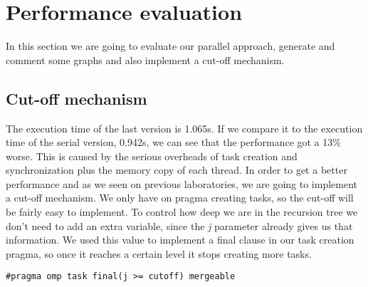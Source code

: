 \section{Performance evaluation}
\justify
In this section we are going to evaluate our parallel approach, generate and comment some graphs and also implement a cut-off mechanism.
\subsection{Cut-off mechanism}
The execution time of the last version is 1.065s. If we compare it to the execution time of the serial version, 0.942s, we can see that the performance got a 13\% worse. This is caused by the serious overheads of task creation and synchronization plus the memory copy of each thread. In order to get a better performance and as we seen on previous laboratories, we are going to implement a cut-off mechanism.
\justify
We only have on pragma creating tasks, so the cut-off will be fairly easy to implement. To control how deep we are in the recursion tree we don't need to add an extra variable, since the \textit{j} parameter already gives us that information. We used this value to implement a final clause in our task creation pragma, so once it reaches a certain level it stops creating more tasks.   
\begin{lstlisting}
#pragma omp task final(j >= cutoff) mergeable
\end{lstlisting}

